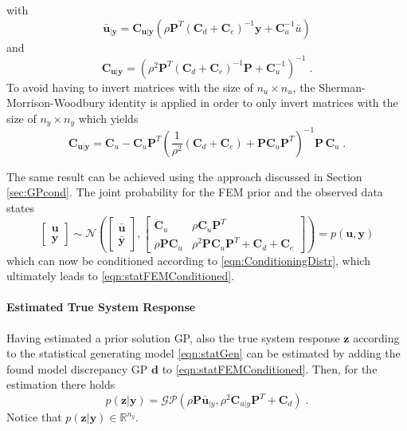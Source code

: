 \documentclass[%
  a4paper,oneside,%
  11pt,%
  smallchapters,
  style=printdev,
  extramargin,
  green,%
  rgb, <cmyk>
  ]{tubsbook}
\begin{document}
%
with
%
\begin{equation}
\bm{\bar{u}}_{|\bm{y}} = \bm{C}_{\bm{u}|\bm{y}} \left(   \rho \bm{P}^T  (\bm{C}_d + \bm{C}_e)^{-1}  \bm{y}  +  \bm{C}_u^{-1}  \bar{u}   \right)
\end{equation}
and
\begin{equation}
\bm{C}_{\bm{u}|\bm{y}} = \left(      \rho^2  \bm{P}^T   (\bm{C}_d + \bm{C}_e)^{-1}  \bm{P}  +  \bm{C}_u^{-1}    \right)^{-1} \;.
\end{equation}
To avoid having to invert matrices with the size of $n_u \times n_u$, the Sherman-Morrison-Woodbury identity \cite{riedel1992} is applied \cite{girolami2021} in order to only invert matrices with the size of $n_y \times n_y$ which yields
\begin{equation}
\bm{C}_{\bm{u}|\bm{y}} = \bm{C}_u - \bm{C}_u \bm{P}^T (\frac{1}{\rho^2} (\bm{C}_d + \bm{C}_e) + \bm{P} \bm{C}_u \bm{P}^T)^{-1} \bm{P}\,\bm{C}_u \;.
\end{equation}

The same result can be achieved using the approach discussed in Section \ref{sec:GPcond}. The joint probability for the FEM prior and the observed data states
\begin{equation}
\begin{bmatrix}
           \bm{u}\\
          \bm{y}
         \end{bmatrix} \sim \mathcal{N}\left( \begin{bmatrix}
           \bar{\bm{u}}  \\
           \bar{\bm{y}}
         \end{bmatrix}, \begin{bmatrix}
\bm{C}_u & \rho \bm{C}_u \bm{P}^T \\
\rho \bm{P} \bm{C}_u  & \rho^2 \bm{P} \bm{C}_u \bm{P}^T + \bm{C}_d + \bm{C}_e 
\end{bmatrix}  \right) = p(\bm{u},\bm{y})
\end{equation}
which can now be conditioned according to \eqref{eqn:ConditioningDistr}, which ultimately leads to \eqref{eqn:statFEMConditioned}.

\paragraph{Estimated True System Response}
Having estimated a prior solution GP, also the true system response $\bm{z}$ according to the statistical generating model \eqref{eqn:statGen} can be estimated by adding the found model discrepancy GP $\bm{d}$ to \eqref{eqn:statFEMConditioned}. Then, for the estimation there holds
\begin{equation}
p(\bm{z}|\bm{y}) = \mathcal{GP}(\rho\bm{P}\bar{\bm{u}}_{|y}, \rho^2\bm{C}_{u|y}\bm{P}^T + \bm{C}_d) \;.
\label{eqn:trueProcEstEq}
\end{equation}
Notice that $p(\bm{z}|\bm{y}) \in \mathbb{R}^{n_y}$. 
\end{document}
